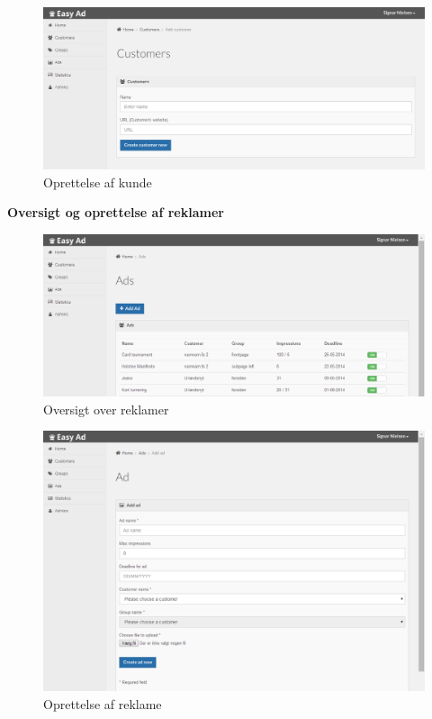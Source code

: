 \documentclass[a4paper,12pt]{article}
\begin{document}
\begin{figure}[h!]
  \centering
    \includegraphics[width=\textwidth]{customer_add.png}
  \caption{Oprettelse af kunde}
\end{figure}

\textbf{Oversigt og oprettelse af reklamer}
\begin{figure}[h!]
  \centering
    \includegraphics[width=\textwidth]{ads.png}
  \caption{Oversigt over reklamer}
\end{figure}

\begin{figure}[h!]
  \centering
    \includegraphics[width=\textwidth]{ad_add.png}
  \caption{Oprettelse af reklame}
\end{figure}
\end{document}
